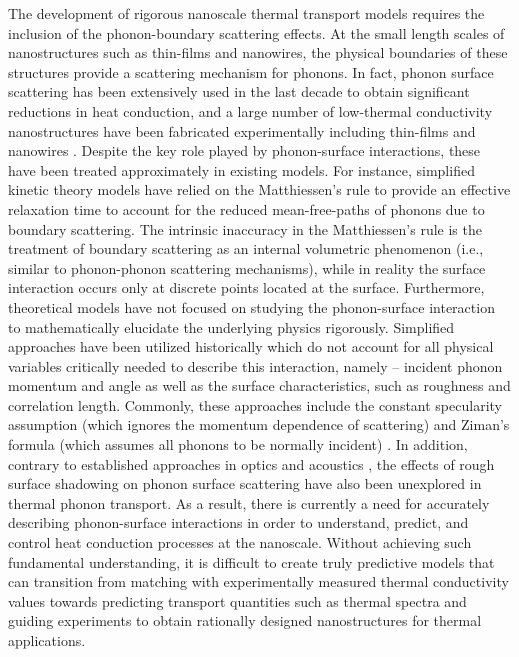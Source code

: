 The development of rigorous nanoscale thermal transport models requires the inclusion of the phonon-boundary scattering effects.  At the small length scales of nanostructures such as thin-films and nanowires, the physical boundaries of these structures provide a scattering mechanism for phonons. In fact, phonon surface scattering has been extensively used in the last decade to obtain significant reductions in heat conduction, and a large number of low-thermal conductivity nanostructures have been fabricated experimentally including thin-films  \cite{RN136,RN122,RN127,RN189,RN109} and nanowires \cite{RN20,RN88,NW_hochbaum,RN111,RN130,RN337,RN483}. Despite the key role played by phonon-surface interactions, these have been treated approximately in existing models. For instance, simplified kinetic theory models have relied on the Matthiessen’s rule \cite{book_Ziman} to provide an effective relaxation time to account for the reduced mean-free-paths of phonons due to boundary scattering. The intrinsic inaccuracy in the Matthiessen’s rule is the treatment of boundary scattering as an internal volumetric phenomenon (i.e., similar to phonon-phonon scattering mechanisms), while in reality the surface interaction occurs only at discrete points located at the surface. Furthermore, theoretical models have not focused on studying the phonon-surface interaction to mathematically elucidate the underlying physics rigorously. Simplified approaches have been utilized historically which do not account for all physical variables critically needed to describe this interaction, namely -- incident phonon momentum and angle as well as the surface characteristics, such as roughness and correlation length. Commonly, these approaches include the constant specularity assumption (which ignores the momentum dependence of scattering) and Ziman’s formula (which assumes all phonons to be normally incident) \cite{book_Ziman}. In addition, contrary to established approaches in optics and acoustics \cite{RN8}, the effects of rough surface shadowing on phonon surface scattering have also been unexplored in thermal phonon transport.  As a result, there is currently a need for accurately describing phonon-surface interactions in order to understand, predict, and control heat conduction processes at the nanoscale. Without achieving such fundamental understanding, it is difficult to create truly predictive models that can transition from matching with experimentally measured thermal conductivity values towards predicting transport quantities such as thermal spectra and guiding experiments to obtain rationally designed nanostructures for thermal applications.

